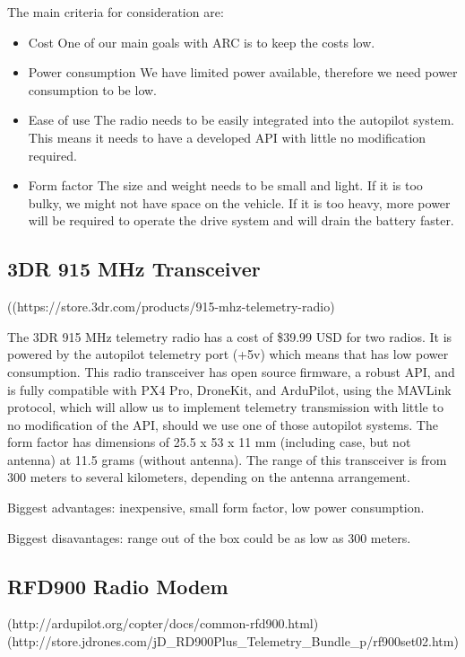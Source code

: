 \documentclass[compsoc,draftclsnofoot,onecolumn,10pt]{IEEEtran}
\begin{document}
The main criteria for consideration are:
\begin{itemize}
	\item Cost
		\subitem One of our main goals with ARC is to keep the costs low.
	\item Power consumption
		\subitem We have limited power available, therefore we need power consumption to
	be low.
	\item Ease of use
		\subitem The radio needs to be easily integrated into the autopilot system. This
	means it needs to have a developed API with little no modification
	required.
	\item Form factor
		\subitem The size and weight needs to be small and light. If it is too bulky, we
	might not have space on the vehicle. If it is too heavy, more power will
	be required to operate the drive system and will drain the battery
	faster.
\end{itemize}


\subsection{3DR 915 MHz Transceiver}  ((https://store.3dr.com/products/915-mhz-telemetry-radio)\par

The 3DR 915 MHz telemetry radio has a cost of \$39.99 USD for two radios. It is
powered by the autopilot telemetry port (+5v) which means that has low power
consumption. This radio transceiver has open source firmware, a robust API,
and is fully compatible with PX4 Pro, DroneKit, and ArduPilot, using the
MAVLink protocol, which will allow us to implement telemetry transmission with
little to no modification of the API, should we use one of those autopilot
systems.
The form factor has dimensions of 25.5 x 53 x 11 mm (including case, but not
antenna) at 11.5 grams (without antenna).
The range of this transceiver is from 300 meters to several kilometers,
depending on the antenna arrangement.

Biggest advantages: inexpensive, small form factor, low power consumption.

Biggest disavantages: range out of the box could be as low as 300 meters.


\subsection{RFD900 Radio Modem}
(http://ardupilot.org/copter/docs/common-rfd900.html)(http://store.jdrones.com/jD\_RD900Plus\_Telemetry\_Bundle\_p/rf900set02.htm)\par
\end{document}
